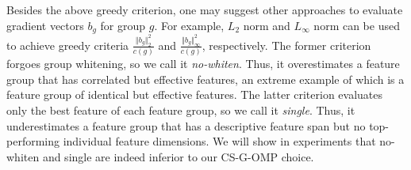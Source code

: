 Besides the above greedy criterion, one may suggest other approaches 
to evaluate gradient vectors $b_g$ for group $g$. For example, 
$L_2$ norm and $L_{\infty}$ norm can be used to 
achieve greedy criteria $\frac{\Vert b_g \Vert_2^2}{c(g)}$ and 
$\frac{\Vert b_g \Vert ^2_{\infty}}{c(g)}$, respectively. 
The former criterion forgoes group whitening, so we call it \textit{no-whiten}.
Thus, it overestimates a feature group that has correlated 
but effective features, an extreme example of which is a
feature group of identical but effective features. The latter
criterion evaluates only the best feature of each feature group, so we call it \textit{single}. Thus, it
underestimates a feature group that has a descriptive 
feature span but no top-performing individual feature dimensions.
We will show in experiments that no-whiten and single
are indeed inferior to our CS-G-OMP choice. 

